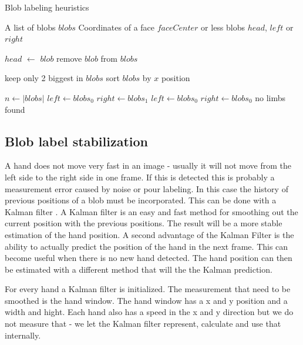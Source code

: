 \begin{algorithm}
\caption{Blob labeling heuristics}
\label{alg:blobheuristics}
\begin{algorithmic}
   \REQUIRE A list of blobs $blobs$
   \REQUIRE Coordinates of a face $faceCenter$
    or less blobs $head$, $left$ or $right$

			\STATE $head$ $\leftarrow$ $blob$
			\STATE remove $blob$ from $blobs$
		\ENDIF
	\ENDFOR

	\STATE keep only 2 biggest in $blobs$
	\STATE sort $blobs$ by $x$ position

	\STATE $n \leftarrow |blobs|$
	    \STATE $left \leftarrow blobs_0$
	    \STATE $right \leftarrow blobs_1$
	\ELSE
		        \STATE $left \leftarrow blobs_0$
		    \ELSE
		        \STATE $right \leftarrow blobs_0$
			\ENDIF
		\ENDIF
	\ELSE
	    \STATE no limbs found
	\ENDIF
\end{algorithmic}
\end{algorithm}



\subsection*{Blob label stabilization}
A hand does not move very fast in an image - usually it will not move from the left side to the right side in one frame. If this is detected this is probably a measurement error caused by noise or pour labeling. In this case the history of previous positions of a blob must be incorporated. This can be done with a Kalman filter \cite{welch1995}. A Kalman filter is an easy and fast method for smoothing out the current position with the previous positions. The result will be a more stable estimation of the hand position. A second advantage of the Kalman Filter is the ability to actually predict the position of the hand in the next frame. This can become useful when there is no new hand detected. The hand position can then be estimated with a different method that will the the Kalman prediction.

For every hand a Kalman filter is initialized. The measurement that need to be smoothed is the hand window. The hand window has a x and y position and a width and hight. Each hand also has a speed in the x and y direction but we do not measure that - we let the Kalman filter represent, calculate and use that internally. 


